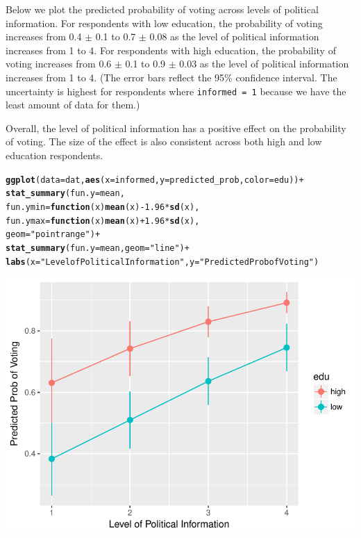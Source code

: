 \documentclass{article}\usepackage[]{graphicx}\usepackage[]{color}
\makeatletter
\def\maxwidth{ %
  \ifdim\Gin@nat@width>\linewidth
    \linewidth
  \else
    \Gin@nat@width
  \fi
}
\newcommand{\hlnum}[1]{\textcolor[rgb]{0.686,0.059,0.569}{#1}}%
\newcommand{\hlstr}[1]{\textcolor[rgb]{0.192,0.494,0.8}{#1}}%
\newcommand{\hlopt}[1]{\textcolor[rgb]{0,0,0}{#1}}%
\newcommand{\hlstd}[1]{\textcolor[rgb]{0.345,0.345,0.345}{#1}}%
\newcommand{\hlkwa}[1]{\textcolor[rgb]{0.161,0.373,0.58}{\textbf{#1}}}%
\newcommand{\hlkwc}[1]{\textcolor[rgb]{0.333,0.667,0.333}{#1}}%
\newcommand{\hlkwd}[1]{\textcolor[rgb]{0.737,0.353,0.396}{\textbf{#1}}}%
\newenvironment{kframe}{%
 \def\at@end@of@kframe{}%
 \ifinner\ifhmode%
  \def\at@end@of@kframe{\end{minipage}}%
  \begin{minipage}{\columnwidth}%
 \fi\fi%
 \def\FrameCommand##1{\hskip\@totalleftmargin \hskip-\fboxsep
 \colorbox{shadecolor}{##1}\hskip-\fboxsep
     \hskip-\linewidth \hskip-\@totalleftmargin \hskip\columnwidth}%
 \MakeFramed {\advance\hsize-\width
   \@totalleftmargin\z@ \linewidth\hsize
   \@setminipage}}%
 {\par\unskip\endMakeFramed%
 \at@end@of@kframe}
\newenvironment{knitrout}{}{} %
\makeatother
\begin{document}
Below we plot the predicted probability of voting across levels of political information. For respondents with low education, the probability of voting increases from 0.4 $\pm$ 0.1 to 0.7 $\pm$ 0.08 as the level of political information increases from 1 to 4. For respondents with high education, the probability of voting increases from 0.6 $\pm$ 0.1 to 0.9 $\pm$ 0.03 as the level of political information increases from 1 to 4. (The error bars reflect the 95\% confidence interval. The uncertainty is highest for respondents where \verb`informed = 1` because we have the least amount of data for them.)

Overall, the level of political information has a positive effect on the probability of voting. The size of the effect is also consistent across both high and low education respondents.

\begin{knitrout}
\color{fgcolor}\begin{kframe}
\begin{alltt}
\hlkwd{ggplot}\hlstd{(}\hlkwc{data} \hlstd{= dat,} \hlkwd{aes}\hlstd{(}\hlkwc{x} \hlstd{= informed,} \hlkwc{y} \hlstd{= predicted_prob,} \hlkwc{color} \hlstd{= edu))} \hlopt{+}
  \hlkwd{stat_summary}\hlstd{(}\hlkwc{fun.y} \hlstd{= mean,}
               \hlkwc{fun.ymin} \hlstd{=} \hlkwa{function}\hlstd{(}\hlkwc{x}\hlstd{)} \hlkwd{mean}\hlstd{(x)} \hlopt{-} \hlnum{1.96} \hlopt{*} \hlkwd{sd}\hlstd{(x),}
               \hlkwc{fun.ymax} \hlstd{=} \hlkwa{function}\hlstd{(}\hlkwc{x}\hlstd{)} \hlkwd{mean}\hlstd{(x)} \hlopt{+} \hlnum{1.96} \hlopt{*} \hlkwd{sd}\hlstd{(x),}
               \hlkwc{geom} \hlstd{=} \hlstr{"pointrange"}\hlstd{)} \hlopt{+}
  \hlkwd{stat_summary}\hlstd{(}\hlkwc{fun.y} \hlstd{= mean,} \hlkwc{geom} \hlstd{=} \hlstr{"line"}\hlstd{)} \hlopt{+}
  \hlkwd{labs}\hlstd{(}\hlkwc{x} \hlstd{=} \hlstr{"Level of Political Information"}\hlstd{,} \hlkwc{y} \hlstd{=} \hlstr{"Predicted Prob of Voting"}\hlstd{)}
\end{alltt}
\end{kframe}
\includegraphics[width=\maxwidth]{figure/unnamed-chunk-10-1} 

\end{knitrout}
\end{document}
